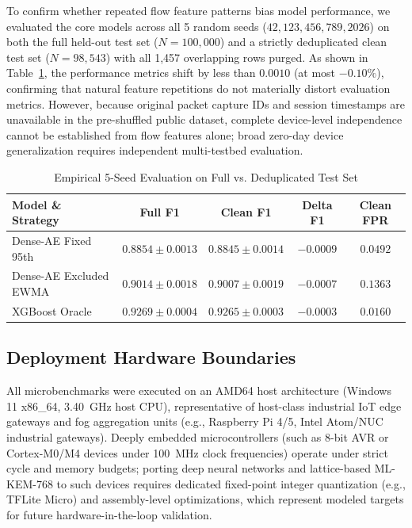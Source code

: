 \documentclass[journal]{IEEEtran}
\begin{document}
To confirm whether repeated flow feature patterns bias model performance, we evaluated the core models across all 5 random seeds ($42, 123, 456, 789, 2026$) on both the full held-out test set ($N=100,000$) and a strictly deduplicated clean test set ($N=98,543$) with all 1,457 overlapping rows purged. As shown in Table~\ref{tab:dedup_eval}, the performance metrics shift by less than $0.0010$ (at most $-0.10\%$), confirming that natural feature repetitions do not materially distort evaluation metrics. However, because original packet capture IDs and session timestamps are unavailable in the pre-shuffled public dataset, complete device-level independence cannot be established from flow features alone; broad zero-day device generalization requires independent multi-testbed evaluation.

\begin{table}[h]
\centering
\caption{Empirical 5-Seed Evaluation on Full vs. Deduplicated Test Set}
\label{tab:dedup_eval}
\begin{tabular}{lcccc}
\toprule
Model \& Strategy & Full F1 & Clean F1 & Delta F1 & Clean FPR \\
\midrule
Dense-AE Fixed 95th & $0.8854 \pm 0.0013$ & $0.8845 \pm 0.0014$ & $-0.0009$ & $0.0492$ \\
Dense-AE Excluded EWMA & $0.9014 \pm 0.0018$ & $0.9007 \pm 0.0019$ & $-0.0007$ & $0.1363$ \\
XGBoost Oracle & $0.9269 \pm 0.0004$ & $0.9265 \pm 0.0003$ & $-0.0003$ & $0.0160$ \\
\bottomrule
\end{tabular}
\end{table}

\subsection{Deployment Hardware Boundaries}
All microbenchmarks were executed on an AMD64 host architecture (Windows 11 x86\_64, 3.40~GHz host CPU), representative of host-class industrial IoT edge gateways and fog aggregation units (e.g., Raspberry Pi 4/5, Intel Atom/NUC industrial gateways). Deeply embedded microcontrollers (such as 8-bit AVR or Cortex-M0/M4 devices under 100~MHz clock frequencies) operate under strict cycle and memory budgets; porting deep neural networks and lattice-based ML-KEM-768 to such devices requires dedicated fixed-point integer quantization (e.g., TFLite Micro) and assembly-level optimizations, which represent modeled targets for future hardware-in-the-loop validation.
\end{document}
